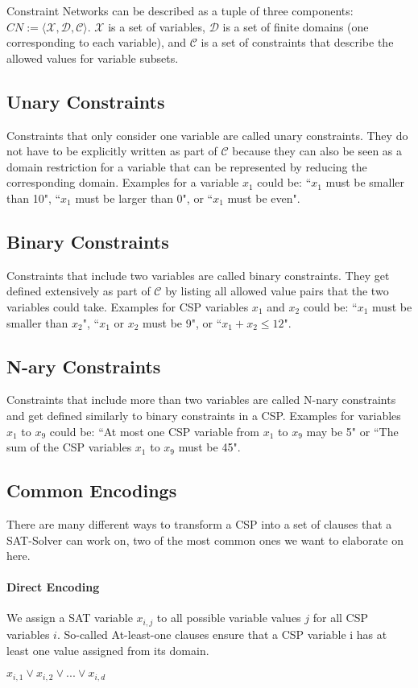 Constraint Networks can be described as a tuple of three components: $CN := \langle \mathcal{X},  \mathcal{D},  \mathcal{C}\rangle$.
$\mathcal{X}$ is a set of variables, $\mathcal{D}$ is a set of finite domains (one corresponding to each variable), and $\mathcal{C}$ is a set of constraints that describe the allowed values for variable subsets.

\subsection{Unary Constraints}
Constraints that only consider one variable are called unary constraints. They do not have to be explicitly written as part of $\mathcal{C}$ because they can also be seen as a domain restriction for a variable that can be represented by reducing the corresponding domain. Examples for a variable $x_1$ could be: ``$x_1$ must be smaller than 10", ``$x_1$ must be larger than 0", or ``$x_1$ must be even".

\subsection{Binary Constraints}
Constraints that include two variables are called binary constraints. They get defined extensively as part of $\mathcal{C}$ by listing all allowed value pairs that the two variables could take. Examples for CSP variables $x_1$ and $x_2$ could be: ``$x_1$ must be smaller than $x_2$", ``$x_1$ or $x_2$ must be 9", or ``$x_1 + x_2 \leq 12$".

\subsection{N-ary Constraints}
Constraints that include more than two variables are called N-nary constraints and get defined similarly to binary constraints in a CSP. Examples for variables $x_1$ to $x_9$ could be: ``At most one CSP variable from $x_1$ to $x_9$ may be 5" or ``The sum of the CSP variables $x_1$ to $x_9$ must be 45".

\subsection{Common Encodings}
There are many different ways to transform a CSP into a set of clauses that a SAT-Solver can work on, two of the most common ones we want to elaborate on here.

\paragraph{Direct Encoding \cite{walsh2000SATvCSP}\cite{gent20002ArcConsistencyInSAT}}
We assign a SAT variable $x_{i,j}$ to all possible variable values $j$ for all CSP variables $i$. So-called At-least-one clauses ensure that a CSP variable i has at least one value assigned from its domain.
\begin{center}
    $x_{i,1} \lor x_{i,2} \lor ... \lor x_{i,d}$
\end{center}

